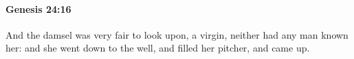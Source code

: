 
		\paragraph{Genesis 24:16} %
			\label{GENESIS-24-16}

			And the damsel was very fair to look upon, a virgin, neither had any man known her: and she went down to the well, and filled her pitcher, and came up.


